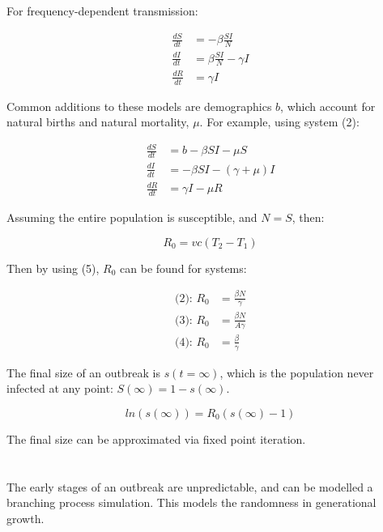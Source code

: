 \documentclass[twocolumn]{article}
\begin{document}
For frequency-dependent transmission:

\begin{align}
    \frac{dS}{dt} &= -\beta \frac{SI}{N} \nonumber \\
    \frac{dI}{dt} &= \beta \frac{SI}{N} - \gamma I \\
    \frac{dR}{dt} &= \gamma I \nonumber
\end{align}

Common additions to these models are demographics $ b $, which account for natural births and natural mortality, $ \mu $. For example, using system (2):

\begin{align}
    \frac{dS}{dt} &= b -\beta SI - \mu S \nonumber \\
    \frac{dI}{dt} &= -\beta SI - (\gamma + \mu) I \nonumber \\
    \frac{dR}{dt} &= \gamma I - \mu R \nonumber 
\end{align}

Assuming the entire population is susceptible, and $ N = S $, then:

\begin{equation}
    R_0 = vc(T_2 - T_1)
\end{equation}

Then by using (5), $ R_0 $ can be found for systems:

\begin{align}
    \text{(2): } R_0 &= \frac{\beta N}{\gamma} \nonumber \\
    \text{(3): } R_0 &= \frac{\beta N}{A \gamma} \nonumber \\
    \text{(4): } R_0 &= \frac{\beta}{\gamma} \nonumber
\end{align}

The final size of an outbreak is $ s(t=\infty) $, which is the population never infected at any point: $ S(\infty) = 1 - s(\infty) $.

\begin{equation}
    ln(s(\infty)) = R_0(s(\infty) - 1) \nonumber
\end{equation}

The final size can be approximated via fixed point iteration.

\section*{}

The early stages of an outbreak are unpredictable, and can be modelled a branching process simulation. This models the randomness in generational growth.
\end{document}

